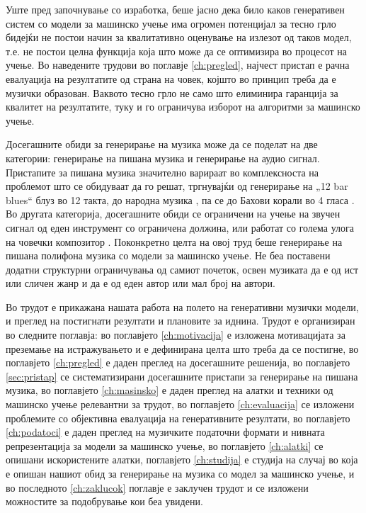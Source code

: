 Уште пред започнување со изработка, беше јасно дека било каков генеративен систем со модели за машинско учење има огромен потенцијал за тесно грло бидејќи не постои начин за квалитативно оценување на излезот од таков модел, т.е. не постои целна функција која што може да се оптимизира во процесот на учење. Во наведените трудови во поглавје \ref{ch:pregled}, најчест пристап е рачна евалуација на резултатите од страна на човек, којшто во принцип треба да е музички образован. Ваквото тесно грло не само што елиминира гаранција за квалитет на резултатите, туку и го ограничува изборот на алгоритми за машинско учење. 

Досегашните обиди за генерирање на музика може да се поделат на две категории: генерирање на пишана музика и генерирање на аудио сигнал. Пристапите за пишана музика значително варираат во комплексноста на проблемот што се обидуваат да го решат, тргнувајќи од генерирање на „12 bar blues“ \cite{Eck2002} блуз во 12 такта, до народна музика \cite{Sturm2016}, па се до Бахови корали во 4 гласа \cite{Liang2017,Hadjeres2016}. Во другата категорија, досегашните обиди \cite{Oord2016} се ограничени на учење на звучен сигнал од еден инструмент со ограничена должина, или работат со голема улога на човечки композитор \cite{Ghedini2015}. Поконкретно целта на овој труд беше генерирање на пишана полифона музика со модели за машинско учење. Не беа поставени додатни структурни ограничувања од самиот почеток, освен музиката да е од ист или сличен жанр и да е од еден автор или мал број на автори.

Во трудот е прикажана нашата работа на полето на генеративни музички модели, и преглед на постигнати резултати и плановите за иднина. Трудот е организиран во следните поглавја: во поглавјето \ref{ch:motivacija} е изложена мотивацијата за преземање на истражувањето и е дефинирана целта што треба да се постигне, во поглавјето \ref{ch:pregled} е даден преглед на досегашните решенија, во поглавјето \ref{sec:pristap} се систематизирани досегашните пристапи за генерирање на пишана музика, во поглавјето \ref{ch:masinsko} е даден преглед на алатки и техники од машинско учење релевантни за трудот, во поглавјето \ref{ch:evaluacija} се изложени проблемите со објективна евалуација на генеративните резултати, во поглавјето \ref{ch:podatoci} е даден преглед на музичките податочни формати и нивната репрезентација за модели за машинско учење, во поглавјето \ref{ch:alatki} се опишани искористените алатки, поглавјето \ref{ch:studija} е студија на случај во која е опишан нашиот обид за генерирање на музика со модел за машинско учење, и во последното \ref{ch:zaklucok} поглавје е заклучен трудот и се изложени можностите за подобрување кои беа увидени.

